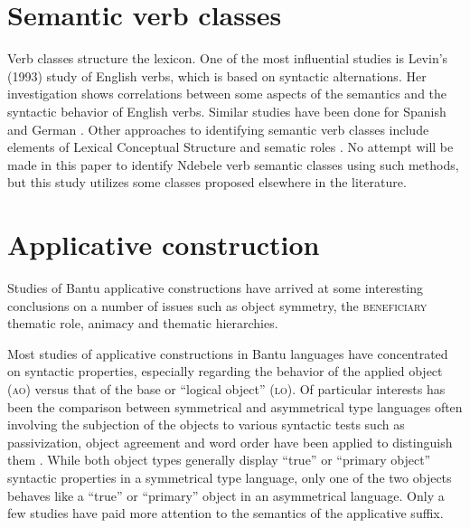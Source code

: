 \documentclass[output=paper]{langsci/langscibook}
\begin{document}
\section{Semantic verb classes}\label{sec:sibanda:}

Verb classes structure the lexicon. One of the most influential studies is Levin’s (1993) study of English verbs, which is based on syntactic alternations. Her investigation shows correlations between some aspects of the semantics and the syntactic behavior of English verbs. Similar studies have been done for Spanish \citep{VazquezEtAl2000} and German \citep{Schumacher1986,SchulteimWaldeBrew2002}. Other approaches to identifying semantic verb classes include elements of Lexical Conceptual Structure \citep{Gruber1967,Jackendoff1983,Jackendoff1990} and sematic roles \citep{Chafe1970,Cook1979,Longacre1976,FoleyVanValin1984,VanValin1993}. No attempt will be made in this paper to identify Ndebele verb semantic classes using such methods, but this study utilizes some classes proposed elsewhere in the literature.

\section{Applicative construction} \label{sec:sibanda:}

Studies of Bantu applicative constructions have arrived at some interesting conclusions on a number of issues such as object symmetry, the \textsc{beneficiary} thematic role, animacy and thematic hierarchies. 

Most studies of applicative constructions in Bantu languages have concentrated on syntactic properties, especially regarding the behavior of the applied object (\textsc{ao}) versus that of the base or “logical object” (\textsc{lo}). Of particular interests has been the comparison between symmetrical and asymmetrical type languages often involving the subjection of the objects to various syntactic tests such as passivization, object agreement and word order have been applied to distinguish them \citep{BresnanMosh1990,NgonyaniGithinji2006,Pylkkanen2000,Machobane1989,AlsinaMchombo1993,Baker1988,Harford1993,Ngonyani1996}. While both object types generally display “true” or “primary object” syntactic properties in a symmetrical type language, only one of the two objects behaves like a “true” or “primary” object in an asymmetrical language. Only a few studies have paid more attention to the semantics of the applicative suffix. 
\end{document}

